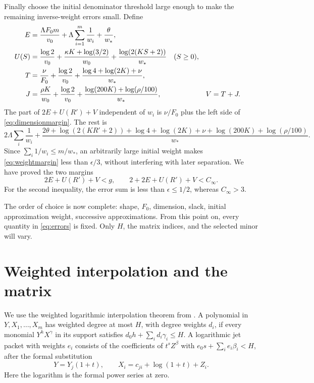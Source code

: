 \documentclass[11pt]{article}
\theoremstyle{definition}
\theoremstyle{remark}
\theoremstyle{plain}
\begin{document}
Finally choose the initial denominator threshold large enough to make the
remaining inverse-weight errors small. Define
\begin{align}
 E&=\frac{\Lambda F_0m}{v_0}+\Lambda\sum_{i=1}^m\frac1{w_i}
                          +\frac\theta{w_*},\label{eq:errors}\\
 U(S)&=\frac{\log2}{v_0}+\frac{\kappa K+\log(3/2)}{w_0}
                   +\frac{\log(2(KS+2))}{w_*}\quad(S\ge0),\notag\\
 T&=\frac\nu{F_0}+\frac{\log2}{v_0}
                    +\frac{\log4+\log(2K)+\nu}{w_*},\notag\\
 J&=\frac{\rho K}{w_0}+\frac{\log2}{v_0}
                    +\frac{\log(200K)+\log(\rho/100)}{w_*},
 &V&=T+J.\notag
\end{align}
The part of \(2E+U(R')+V\) independent of \(w_i\) is
\(\nu/F_0\) plus the left side of \eqref{eq:dimensionmargin}.
The rest is
\begin{equation}\label{eq:weightmargin}
 2\Lambda\sum_i\frac1{w_i}
 +\frac{2\theta+\log(2(KR'+2))+\log4+\log(2K)+\nu
       +\log(200K)+\log(\rho/100)}{w_*}.
\end{equation}
Since \(\sum_i1/w_i\le m/w_*\), an arbitrarily large initial weight
makes \eqref{eq:weightmargin} less than \(\epsilon/3\), without
interfering with later separation. We have proved the two margins
\begin{equation}\label{eq:twomargins}
 2E+U(R')+V<g,
 \qquad 2+2E+U(R')+V<C_\infty.
\end{equation}
For the second inequality, the error sum is less than
\(\epsilon\le1/2\), whereas \(C_\infty>3\).

The order of choice is now complete: shape, \(F_0\), dimension, slack,
initial approximation weight, successive approximations. From this point
on, every quantity in \eqref{eq:errors} is fixed. Only \(H\), the
matrix indices, and the selected minor will vary.

\section{Weighted interpolation and the matrix}\label{sec:geometry}
We use the weighted logarithmic interpolation theorem from
\cite{rational}. A polynomial in
\(Y,X_1,\ldots,X_m\) has weighted degree at most \(H\), with degree
weights \(d_i\), if every monomial \(Y^hX^\gamma\) in its support
satisfies \(d_0h+\sum_i d_i\gamma_i\le H\). A logarithmic jet packet
with weights \(e_i\) consists of the coefficients of
\(t^sZ^\beta\) with \(e_0s+\sum_i e_i\beta_i<H\), after the formal
substitution
\begin{equation}\label{eq:formalcoords}
 Y=Y_j(1+t),\qquad X_i=c_{ji}+\log(1+t)+Z_i.
\end{equation}
Here the logarithm is the formal power series at zero.
\end{document}
